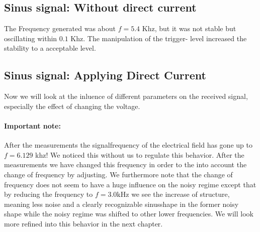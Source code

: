 \subsection{Sinus signal: Without direct current}
The Frequency generated was about $f=5.4$ Khz, but it was not stable
but oscillating within $0.1$ Khz. The manipulation of the trigger-
level increased the stability to a acceptable level. 
\subsection{Sinus signal: Applying Direct Current}
Now we will look at the inluence of different parameters on
the received signal, especially the effect of changing the
voltage. 
\paragraph{Important note:} After the measurements the
signalfrequency of the electrical field has gone up to 
$f=6.129$ khz! We noticed this without us to regulate this 
behavior. After the measurements we have changed this frequency in
order to the into account the change of frequency by adjusting.
We furthermore note that the change of frequency
does not seem to have a huge influence on the noisy regime except
that by reducing the frequency to $f=3.0$kHz we see the increase
of structure, meaning less noise and a clearly recognizable
sinusshape in the former noisy shape while the noisy regime
was shifted to other lower frequencies. We will look more refined
into this behavior in the next chapter.
